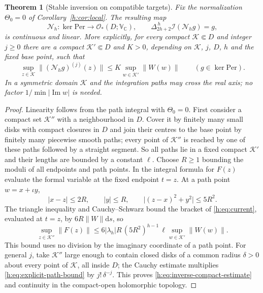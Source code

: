 \documentclass[11pt,a4paper]{article}
\numberwithin{equation}{section}
\newtheorem{theorem}{Theorem}[section]
\theoremstyle{definition}
\theoremstyle{remark}
\theoremstyle{plain}
\newcommand{\CC}{\mathbb C}
\DeclareMathOperator{\Ima}{Im}
\newcommand{\I}{\mathcal I}
\newcommand{\Per}{\mathrm{Per}}
\newcommand{\abs}[1]{\lvert #1\rvert}
\newcommand{\norm}[1]{\lVert #1\rVert}
\newcommand{\dd}{\mathrm d}
\newcommand{\lapH}{\Delta_{2h+2}^{\,h}}
\newcommand{\VC}{\mathbb V_{\CC}}                 %
\newcommand{\Herm}{\Theta}                        %
\begin{document}
\begin{theorem}[Stable inversion on compatible targets]
\label{h:thm:stable-inverse}
Fix the normalization $\Herm_0=0$ of Corollary~\ref{h:cor:local}. The
resulting map
\[
 \mathcal N_h:\ker\Per\longrightarrow\mathcal O_*(D;\VC),\qquad
 \lapH\I(\mathcal N_hg)=g,
\]
is continuous and linear. More explicitly, for every compact
$\mathcal K\Subset D$ and integer $j\ge0$ there are a compact
$\mathcal K'\Subset D$ and $K>0$, depending on $\mathcal K$, $j$, $D$, $h$ and
the fixed base point, such that
\begin{equation}\label{h:eq:inverse-compact-estimate}
 \sup_{z\in\mathcal K}\norm{(\mathcal N_hg)^{(j)}(z)}
 \le K\sup_{w\in\mathcal K'}\norm{W(w)}\qquad(g\in\ker\Per).
\end{equation}
In a symmetric domain $\mathcal K$ and the integration paths may cross the real
axis; no factor $1/\min\abs{\Ima w}$ is needed.
\end{theorem}

\begin{proof}
Linearity follows from the path integral with $\Herm_0=0$. First consider a
compact set $\mathcal K''$ with a neighbourhood in $D$. Cover it by finitely
many small disks with compact closures in $D$ and join their centres to the base
point by finitely many piecewise smooth paths; every point of $\mathcal K''$ is
reached by one of these paths followed by a straight segment. So all paths lie
in a fixed compact $\mathcal K'$ and their lengths are bounded by a constant
$\ell$. Choose $R\ge1$ bounding the moduli of all endpoints and path points. In
the integral formula for $F(z)$ evaluate the formal variable at the fixed
endpoint $t=z$. At a path point $w=x+\iota y$,
\[
 \abs{x-z}\le2R,\qquad\abs y\le R,\qquad\abs{(z-x)^2+y^2}\le5R^2 .
\]
The triangle inequality and Cauchy--Schwarz bound the bracket of
\eqref{h:eq:current}, evaluated at $t=z$, by $6R\norm W\dd s$, so
\begin{equation}\label{h:eq:explicit-path-bound}
 \sup_{z\in\mathcal K''}\norm{F(z)}\le6\abs{\lambda_h}R\,(5R^2)^{h-1}\,\ell
 \sup_{w\in\mathcal K'}\norm{W(w)} .
\end{equation}
This bound uses no division by the imaginary coordinate of a path point. For
general $j$, take $\mathcal K''$ large enough to contain closed disks of a common
radius $\delta>0$ about every point of $\mathcal K$, all inside $D$; the Cauchy
estimate multiplies \eqref{h:eq:explicit-path-bound} by $j!\,\delta^{-j}$. This
proves \eqref{h:eq:inverse-compact-estimate} and continuity in the compact-open
holomorphic topology.
\end{proof}
\end{document}
